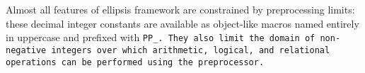 Almost all features of ellipsis framework are constrained by preprocessing
limits: these decimal integer constants are available as object-like
macros named entirely in uppercase and prefixed with \tt{PP_}.
They also limit the domain of non-negative integers over which arithmetic,
logical, and relational operations can be performed using the preprocessor.

\subsection{}


\subsection{}


\subsection{}


\subsection{}


\subsection{}


\subsection{}

